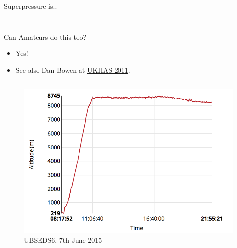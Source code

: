 \documentclass{beamer}
\begin{document}
\begin{frame}{Superpressure is.. }
\begin{columns}
\begin{column}{0.4\textwidth}
\begin{figure}[!ht]
      \end{figure}
    \end{column}
  \end{columns}


\end{frame}

\begin{frame}{Can Amateurs do this too?}

  \begin{itemize}
  \item Yes!
  \item See also Dan Bowen at \href{https://ukhas.org.uk/general:ukhasconference}{UKHAS 2011}.
  \end{itemize}

  \begin{columns}
    \begin{column}{0.5\textwidth}
      \begin{figure}[!ht]
        \includegraphics[width=1\textwidth]{ubseds6_altitude_plot.png}
        \caption{UBSEDS6, 7th June 2015}
      \end{figure}


\end{column}
\end{columns}
\end{frame}
\end{document}
